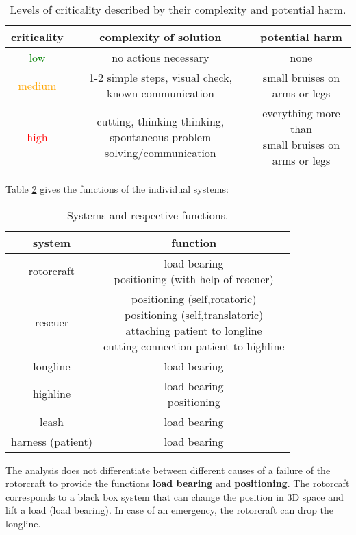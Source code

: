 \documentclass[a4paper,10pt]{scrartcl}
\begin{document}
\begin{table}[!ht]
\centering
\begin{tabular}{ c | c | c }
 criticality & complexity of solution & potential harm \\ 
 \hline
 \hline 
 \textcolor{green}{low} & no actions necessary & none \\ 
 \hline
 \textcolor{orange}{medium} & 1-2 simple steps, visual check, known communication & small bruises on arms or legs \\ 
 \hline
 \textcolor{red}{high} & \makecell{cutting, thinking thinking, \\ spontaneous problem solving/communication} & \makecell{everything more than \\ small bruises on arms or legs} \\  
   
\end{tabular}
\caption{Levels of criticality described by their complexity and potential harm.}
\label{tab:crit}
\end{table}

Table \ref{tab:func} gives the functions of the individual systems:
\begin{table}[!ht]
\centering
\begin{tabular}{ c | c  }
 system & function \\ 
 \hline
 \hline 
 rotorcraft & \makecell{load bearing \\ positioning (with help of rescuer)} \\
 \hline 
 rescuer & \makecell{positioning (self,rotatoric) \\ positioning (self,translatoric) \\ attaching patient to longline \\ cutting connection patient to highline} \\
 \hline
 longline & load bearing \\
 \hline
 highline & \makecell{load bearing \\ positioning} \\
 \hline
 leash & load bearing \\
 \hline
 harness (patient) & load bearing \\ 
\end{tabular}
\caption{Systems and respective functions.}
\label{tab:func}
\end{table}

The analysis does not differentiate between different causes of a failure of the rotorcraft to provide the functions \textbf{load bearing} and \textbf{positioning}. The rotorcaft corresponds to a black box system that can change the position in 3D space and lift a load (load bearing). In case of an emergency, the rotorcraft can drop the longline.
\end{document}
